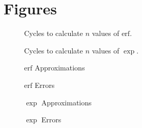 \documentclass[a4paper, 11pt]{memoir}
\newcommand*{\erf}{\text{erf}}
\begin{document}
    \chapter{Figures}
    \begin{figure}[H]
        \centering
        
        \caption{Cycles to calculate $n$ values of $\erf$.}
    \end{figure}
    \begin{figure}[H]
        \centering
        
        \caption{Cycles to calculate $n$ values of $\exp$.}
    \end{figure}
    
    \begin{figure}[H]
        \centering
        
        \caption{$\erf$ Approximations}
    \end{figure}
    \begin{figure}[H]
        \centering
        
        \caption{$\erf$ Errors}
    \end{figure}
    
    \begin{figure}[H]
        \centering
        
        \caption{$\exp$ Approximations}
    \end{figure}
    \begin{figure}[H]
        \centering
        
        \caption{$\exp$ Errors}
    \end{figure}

    \backmatter
    \printglossaries
    \printbibliography[heading=bibintoc]
\end{document}
